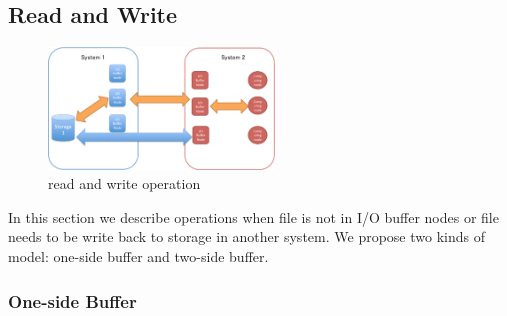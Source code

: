 



\subsection{Read and Write}

\begin{figure}[tb]
	\centering
	\includegraphics[width=6cm]{../img/read_and_write}
	\caption{read and write operation}
	\label{read and write}
\end{figure}

In this section we describe operations when file is not in I/O buffer nodes or file needs to be write back to storage in another system.
We propose two kinds of model: one-side buffer and two-side buffer.

\subsubsection{One-side Buffer}

